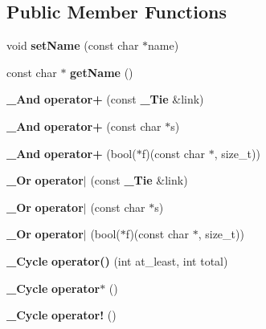 \subsection*{Public Member Functions}
\begin{DoxyCompactItemize}
\item 
\mbox{\label{classbnf_1_1___tie_ac647ba15a4aee726c7995c611db02492}} 
void {\bfseries set\+Name} (const char $\ast$name)
\item 
\mbox{\label{classbnf_1_1___tie_a5ada30dfe6ddee89e0fc1f590be13266}} 
const char $\ast$ {\bfseries get\+Name} ()
\item 
\mbox{\label{classbnf_1_1___tie_ace83835bbee0790d181ed4de97086aea}} 
\textbf{ \+\_\+\+And} {\bfseries operator+} (const \textbf{ \+\_\+\+Tie} \&link)
\item 
\mbox{\label{classbnf_1_1___tie_ae6275d0d44f0edd915b5a8709a317017}} 
\textbf{ \+\_\+\+And} {\bfseries operator+} (const char $\ast$s)
\item 
\mbox{\label{classbnf_1_1___tie_a7fcf8ccdc485bfd1bf8d5f187ccadcee}} 
\textbf{ \+\_\+\+And} {\bfseries operator+} (bool($\ast$f)(const char $\ast$, size\+\_\+t))
\item 
\mbox{\label{classbnf_1_1___tie_a0fb85544a86647ff1db09eabe235d730}} 
\textbf{ \+\_\+\+Or} {\bfseries operator$\vert$} (const \textbf{ \+\_\+\+Tie} \&link)
\item 
\mbox{\label{classbnf_1_1___tie_ab5624a8f40f51c8eeb96ec1a47cccce6}} 
\textbf{ \+\_\+\+Or} {\bfseries operator$\vert$} (const char $\ast$s)
\item 
\mbox{\label{classbnf_1_1___tie_af1b6229c7c9c3975b82edbfb5c92ef24}} 
\textbf{ \+\_\+\+Or} {\bfseries operator$\vert$} (bool($\ast$f)(const char $\ast$, size\+\_\+t))
\item 
\mbox{\label{classbnf_1_1___tie_a787b666fa012e38d60e04b46c2ad01ef}} 
\textbf{ \+\_\+\+Cycle} {\bfseries operator()} (int at\+\_\+least, int total)
\item 
\mbox{\label{classbnf_1_1___tie_a2c5e2c656a996cfefff611ac533be9c1}} 
\textbf{ \+\_\+\+Cycle} {\bfseries operator$\ast$} ()
\item 
\mbox{\label{classbnf_1_1___tie_afdd94b85872f795af274e258e66396e7}} 
\textbf{ \+\_\+\+Cycle} {\bfseries operator!} ()
\end{DoxyCompactItemize}
